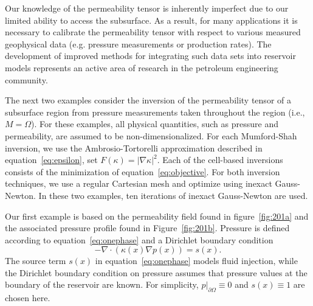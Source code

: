 \documentclass[manuscript,revised]{geophysics}
\begin{document}
Our knowledge of the permeability tensor is inherently imperfect due to our limited ability to access the subsurface.  As a result, for many applications it is necessary to calibrate the permeability tensor with respect to various measured geophysical data (e.g. pressure measurements or production rates).  The development of improved methods for integrating such data sets into reservoir models represents an active area of research in the petroleum engineering community.  

The next two examples consider the inversion of the permeability tensor of a subsurface region from pressure measurements taken throughout the region (i.e., $M=\Omega$). For these examples, all physical quantities, such as pressure and permeability, are assumed to be non-dimensionalized.  For each Mumford-Shah inversion, we use the Ambrosio-Tortorelli approximation described in equation~\ref{eq:epsilon}, set $F(\kappa)=\left\vert \nabla \kappa \right\vert^2$.  Each of the cell-based inversions consists of the minimization of equation~\ref{eq:objective}.  For both inversion techniques, we use a regular Cartesian mesh and optimize using inexact Gauss-Newton.  In these two examples, ten iterations of inexact Gauss-Newton are used.  

Our first example is based on the permeability field found in figure~\ref{fig:201a} and the associated pressure profile found in Figure~\ref{fig:201b}.  Pressure is defined according to equation~\ref{eq:onephase} and a Dirichlet boundary condition
\begin{equation} \label{eq:onephase}
-\nabla \cdot \left( \kappa (x)\nabla p(x) \right)=s(x).
\end{equation}
The source term $s(x)$ in equation~\ref{eq:onephase} models fluid injection, while the Dirichlet boundary condition on pressure assumes that pressure values at the boundary of the reservoir are known.  For simplicity, $p\vert_{\partial\Omega} \equiv 0$ and $s(x) \equiv 1$ are chosen here. 
\end{document}
